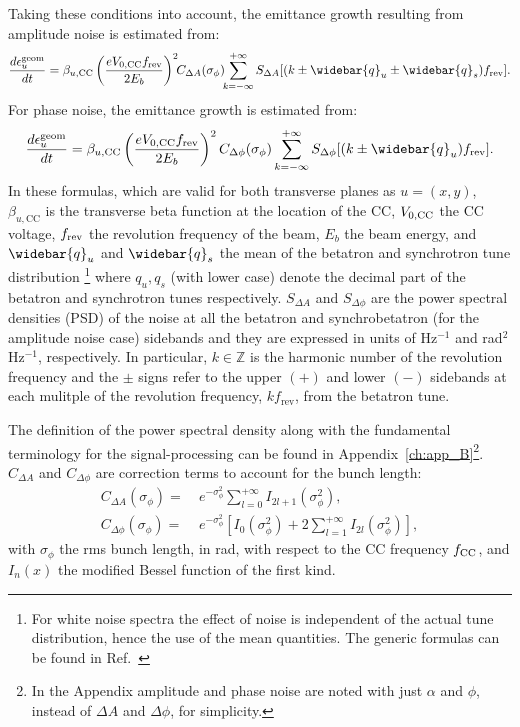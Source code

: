 Taking these conditions into account, the emittance growth resulting from amplitude noise is estimated from:
\begin{equation}\label{eq:dey_an}
    \frac{d\epsilon^{\mathrm{geom}}_u}{dt}  = \beta_{u, \mathrm{CC}} \left( \frac{e\CCvoltage\frev}{2E_b}\right)^2 \!\! C_{\Delta A} (\sigma_{\phi}) \!\! \sum_{k=-\infty}^{+\infty} S_{\Delta A}[(k \pm \widebar{q}_u \pm \widebar{q}_s)\frev].
\end{equation}
For phase noise, the emittance growth is estimated from:
\begin{equation}\label{eq:dey_pn}
    \frac{d\epsilon^{\mathrm{geom}}_u}{dt}  = \beta_{u, \mathrm{CC}}  \left( \frac{e\CCvoltage\frev}{2E_b}\right)^2 C_{\Delta \phi} (\sigma_{\phi}) \sum_{k=-\infty}^{+\infty} S_{\Delta \phi}[(k \pm \widebar{q}_u) \frev].
\end{equation}
In these formulas, which are valid for both transverse planes as $u=(x,y)$, $\beta_{u, \mathrm{CC}}$ is the transverse beta function at the location of the CC, ${V_\mathrm{0, CC}}$ the CC voltage, ${f_\mathrm{rev}}$ the revolution frequency of the beam, $E_b$ the beam energy, and $\widebar{q}_u$ and $\widebar{q}_s$ the mean of the betatron and synchrotron tune distribution \footnote{For white noise spectra the effect of noise is independent of the actual tune distribution, hence the use of the mean quantities. The generic formulas can be found in Ref.~\cite{PhysRevSTAB.18.101001}} where $q_u, q_s$ (with lower case) denote the decimal part of the betatron and synchrotron tunes respectively. $S_{\Delta A}$ and $S_{\Delta \phi}$ are the power spectral densities (PSD) of the noise at all the betatron and synchrobetatron (for the amplitude noise case) sidebands and they are expressed in units of Hz$^{-1}$ and rad$^2$Hz$^{-1}$, respectively. In particular, $k \in \mathbb{Z}$ is the harmonic number of the revolution frequency and the $\pm$ signs refer to the upper $(+)$ and lower $(-)$ sidebands at each mulitple of the revolution frequency, $k f_\mathrm{rev}$, from the betatron tune.

The definition of the power spectral density along with the fundamental terminology for the signal-processing can be found in Appendix~\ref{ch:app_B}\footnote{In the Appendix amplitude and phase noise are noted with just $\alpha$ and $\phi$, instead of $\Delta A$ and $\Delta \phi$, for simplicity.}.
$C_{\Delta A}$ and $C_{\Delta \phi}$ are correction terms to account for the bunch length:
\begin{align}
C_{\Delta A}(\sigma_{\phi}) = ~& e^{-\sigma_{\phi}^2}\sum_{l=0}^{+\infty} I_{2l+1}(\sigma_{\phi}^2),\\
C_{\Delta \phi}(\sigma_{\phi}) = ~& e^{-\sigma_{\phi}^2} \left[I_0(\sigma_{\phi}^2) + 2 \sum_{l=1}^{+\infty} I_{2l}(\sigma_{\phi}^2) \right],
\end{align}
with $\sigma_{\phi}$ the rms bunch length, in rad, with respect to the CC frequency ${f_\mathrm{CC}}$, and $I_n(x)$ the modified Bessel function of the first kind. 

